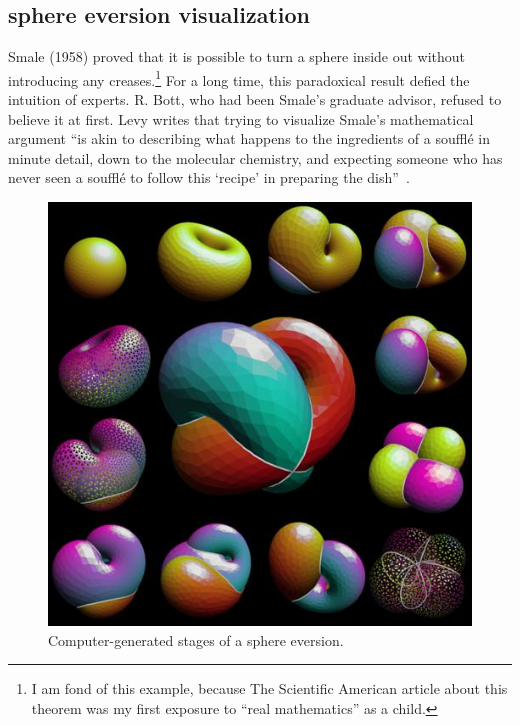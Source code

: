 \documentclass{llncs}
\begin{document}
\subsection{sphere eversion visualization}







Smale (1958) proved that it is possible to turn a sphere inside out
without introducing any creases.\footnote{I am fond of this example,
because The Scientific American
  article \cite{Phi66} about this theorem was my first exposure to ``real
  mathematics'' as a child.}  For a long time, this paradoxical result
defied the intuition of experts.  R. Bott, who had been Smale's
graduate advisor, refused to believe it at first.  Levy writes that
trying to visualize Smale's mathematical argument ``is akin to
describing what happens to the ingredients of a souffl\'e in minute
detail, down to the molecular chemistry, and expecting someone who has
never seen a souffl\'e to follow this `recipe' in preparing the
dish''~\cite{Le95}.

\begin{figure}[h!]
  \centering
\includegraphics[scale=0.5]{bivtile.jpeg}
  \caption{Computer-generated stages of a sphere eversion.}
\label{fig:eversion}
\end{figure}
\end{document}
